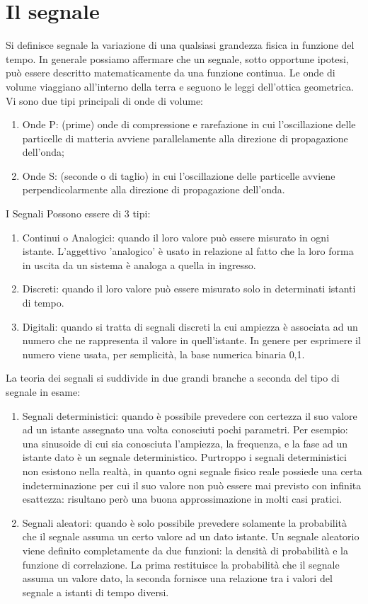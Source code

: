 \documentclass[a4paper,12pt]{article}
\begin{document}
\section{Il segnale}
Si definisce segnale la variazione di una qualsiasi grandezza fisica in funzione del tempo. 
In generale possiamo affermare che un segnale, sotto opportune ipotesi, può essere descritto matematicamente da una funzione continua. Le onde di volume viaggiano all'interno della terra e seguono le leggi dell'ottica geometrica. Vi sono due tipi principali di onde di volume:
\begin{enumerate}
\item Onde P: (prime) onde di compressione e rarefazione in cui l'oscillazione delle particelle di matteria avviene parallelamente alla direzione di propagazione dell'onda; 
\item Onde S: (seconde o di taglio) in cui l'oscillazione delle particelle avviene perpendicolarmente alla direzione di propagazione dell'onda.
\end{enumerate}
I Segnali Possono essere di 3 tipi:
\begin{enumerate}
\item Continui o Analogici: quando il loro valore può essere misurato in ogni istante. L'aggettivo 'analogico' è usato in relazione al fatto che la loro forma in uscita da un sistema è analoga a quella in ingresso.
\item Discreti: quando il loro valore può essere misurato solo in determinati istanti di tempo.
\item Digitali: quando si tratta di segnali discreti la cui ampiezza è associata ad un numero che ne rappresenta il valore in quell'istante. In genere per esprimere il numero viene usata, per semplicità, la base numerica binaria {0,1}.
\end{enumerate}
La teoria dei segnali si suddivide in due grandi branche a seconda del tipo di segnale in esame: 
\begin{enumerate}
\item Segnali deterministici: quando è possibile prevedere con certezza il suo valore ad un istante assegnato una volta conosciuti pochi parametri. Per esempio: una sinusoide di cui sia conosciuta l'ampiezza, la frequenza, e la fase ad un istante dato è un segnale deterministico.
Purtroppo i segnali deterministici non esistono nella realtà, in quanto ogni segnale fisico reale possiede una certa indeterminazione per cui il suo valore non può essere mai previsto con infinita esattezza: risultano però una buona approssimazione in molti casi pratici.
\item Segnali aleatori: quando è solo possibile prevedere solamente la probabilità che il segnale assuma un certo valore ad un dato istante. Un segnale aleatorio viene definito completamente da due funzioni: la densità di probabilità e la funzione di correlazione. La prima restituisce la probabilità che il segnale assuma un valore dato, la seconda fornisce una relazione tra i valori del segnale a istanti di tempo diversi.
\end{enumerate}
\end{document}
